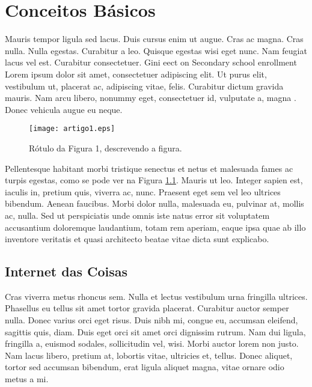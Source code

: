 %
%

\chapter{Conceitos B\'{a}sicos}
Mauris tempor ligula sed lacus. Duis cursus enim ut augue. Cras ac magna. Cras nulla. Nulla egestas. Curabitur a leo. Quisque egestas wisi eget nunc. Nam feugiat lacus vel est. Curabitur consectetuer. Gini eect on Secondary school enrollment Lorem ipsum dolor sit amet, consectetuer adipiscing elit. Ut purus elit, vestibulum ut, placerat ac, adipiscing vitae, felis. Curabitur dictum gravida mauris. Nam arcu libero, nonummy eget, consectetuer id, vulputate a, magna . Donec vehicula augue eu neque.



\begin{figure}[!h]
	\centering
	\texttt{[image: artigo1.eps]}
	\caption{R\'{o}tulo da Figura 1, descrevendo a figura.}
	\label{fig:artigo1}
\end{figure}

Pellentesque habitant morbi tristique senectus et netus et malesuada fames ac turpis egestas, como se pode ver na Figura \ref{fig:artigo1}. Mauris ut leo. Integer sapien est, iaculis in, pretium quis, viverra ac, nunc. Praesent eget sem vel leo ultrices bibendum. Aenean faucibus. Morbi dolor nulla, malesuada eu, pulvinar at, mollis ac, nulla. Sed ut perspiciatis unde omnis iste natus error sit voluptatem accusantium doloremque laudantium, totam rem aperiam, eaque ipsa quae ab illo inventore veritatis et quasi architecto beatae vitae dicta sunt explicabo.

\section{Internet das Coisas}
Cras viverra metus rhoncus sem. Nulla et lectus vestibulum urna fringilla ultrices. Phasellus eu tellus sit amet tortor gravida placerat. Curabitur auctor semper nulla. Donec varius orci eget risus. Duis nibh mi, congue eu, accumsan eleifend, sagittis quis, diam. Duis eget orci sit amet orci dignissim rutrum. Nam dui ligula, fringilla a, euismod sodales, sollicitudin vel, wisi. Morbi auctor lorem non justo. Nam lacus libero, pretium at, lobortis vitae, ultricies et, tellus. Donec aliquet, tortor sed accumsan bibendum, erat ligula aliquet magna, vitae ornare odio metus a mi.

